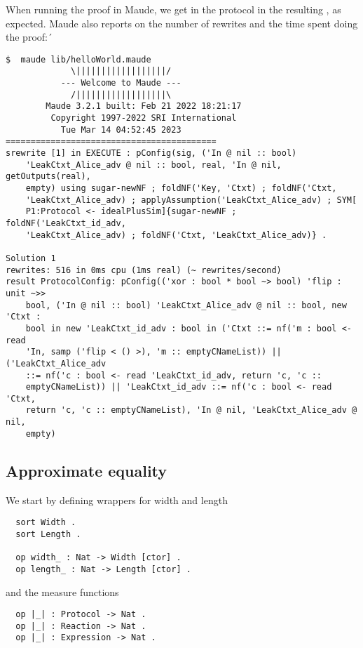 When running the proof in Maude, we get  in the 
protocol in the resulting , as expected. Maude also reports
on the number of rewrites and the time spent doing the proof:´
\begin{lstlisting} 
$  maude lib/helloWorld.maude 
		     \||||||||||||||||||/
		   --- Welcome to Maude ---
		     /||||||||||||||||||\
	    Maude 3.2.1 built: Feb 21 2022 18:21:17
	     Copyright 1997-2022 SRI International
		   Tue Mar 14 04:52:45 2023
==========================================
srewrite [1] in EXECUTE : pConfig(sig, ('In @ nil :: bool)
    'LeakCtxt_Alice_adv @ nil :: bool, real, 'In @ nil, getOutputs(real),
    empty) using sugar-newNF ; foldNF('Key, 'Ctxt) ; foldNF('Ctxt,
    'LeakCtxt_Alice_adv) ; applyAssumption('LeakCtxt_Alice_adv) ; SYM[
    P1:Protocol <- idealPlusSim]{sugar-newNF ; foldNF('LeakCtxt_id_adv,
    'LeakCtxt_Alice_adv) ; foldNF('Ctxt, 'LeakCtxt_Alice_adv)} .

Solution 1
rewrites: 516 in 0ms cpu (1ms real) (~ rewrites/second)
result ProtocolConfig: pConfig(('xor : bool * bool ~> bool) 'flip : unit ~>>
    bool, ('In @ nil :: bool) 'LeakCtxt_Alice_adv @ nil :: bool, new 'Ctxt :
    bool in new 'LeakCtxt_id_adv : bool in ('Ctxt ::= nf('m : bool <- read
    'In, samp ('flip < () >), 'm :: emptyCNameList)) || ('LeakCtxt_Alice_adv
    ::= nf('c : bool <- read 'LeakCtxt_id_adv, return 'c, 'c ::
    emptyCNameList)) || 'LeakCtxt_id_adv ::= nf('c : bool <- read 'Ctxt,
    return 'c, 'c :: emptyCNameList), 'In @ nil, 'LeakCtxt_Alice_adv @ nil,
    empty)

\end{lstlisting}

\subsection{Approximate equality}

We start by defining wrappers for width and length
\begin{lstlisting}  
  sort Width .
  sort Length .
  
  op width_ : Nat -> Width [ctor] .
  op length_ : Nat -> Length [ctor] .
\end{lstlisting}  
\noindent and the measure functions  
\begin{lstlisting}
  op |_| : Protocol -> Nat .
  op |_| : Reaction -> Nat .
  op |_| : Expression -> Nat .
\end{lstlisting}

